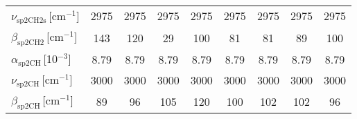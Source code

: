 \begin{tabular}{lcccccccc}
$\nu_\mathrm{sp2CH2s}$\,[cm$^{-1}$] & 2975 & 2975 & 2975 & 2975 & 2975 & 2975 & 2975 & 2975\\
$\beta_\mathrm{sp2CH2}$\,[cm$^{-1}$] & 143 & 120 & 29 & 100 & 81 & 81 & 89 & 100\\
$\alpha_\mathrm{sp2CH}$\,[10$^{-3}$] & 8.79 & 8.79 & 8.79 & 8.79 & 8.79 & 8.79 & 8.79 & 8.79\\
$\nu_\mathrm{sp2CH}$\,[cm$^{-1}$] & 3000 & 3000 & 3000 & 3000 & 3000 & 3000 & 3000 & 3000\\
$\beta_\mathrm{sp2CH}$\,[cm$^{-1}$] & 89 & 96 & 105 & 120 & 100 & 102 & 102 & 96\\
\hline
\end{tabular}
